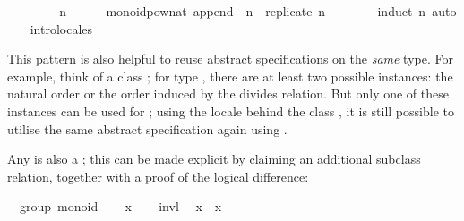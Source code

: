 \begin{isabellebody}
\ \ \isamarkupfalse%
\isanewline
\ \ \ \ \isamarkupfalse%
\ n\isanewline
\ \ \ \ \isamarkupfalse%
\ {}monoid{}pow{}nat\ append\ {}{}\ n\ {}\ replicate\ n{}\isanewline
\ \ \ \ \ \ \isamarkupfalse%
\ {}induct\ n{}\ auto\isanewline
\ \ \isamarkupfalse%
\isanewline
{}\isamarkupfalse%
\ intro{}locales%
\endisatagquote
{\isafoldquote}%
%
\isadelimquote
%
\endisadelimquote
%
\begin{isamarkuptext}%
\noindent This pattern is also helpful to reuse abstract
  specifications on the \emph{same} type.  For example, think of a
  class ; for type , there are at least two
  possible instances: the natural order or the order induced by the
  divides relation.  But only one of these instances can be used for
  \hyperlink{command.instantiation}{\mbox{}}; using the locale behind the class , it is still possible to utilise the same abstract
  specification again using \hyperlink{command.interpretation}{\mbox{}}.%
\end{isamarkuptext}%
\isamarkuptrue%
%
\isamarkuptrue%
%
\begin{isamarkuptext}%
Any  is also a ; this can be made
  explicit by claiming an additional subclass relation, together with
  a proof of the logical difference:%
\end{isamarkuptext}%
\isamarkuptrue%
%
\isadelimquote
%
\endisadelimquote
%
\isatagquote
{}\isamarkupfalse%
\ {}\ group{}\ monoid\isanewline
{}\isamarkupfalse%
\isanewline
\ \ \isamarkupfalse%
\ x\isanewline
\ \ \isamarkupfalse%
\ invl\ \isamarkupfalse%
\ {}x{}\ {}\ x\ {}\ {}{}\ \isamarkupfalse%

\end{isabellebody}
